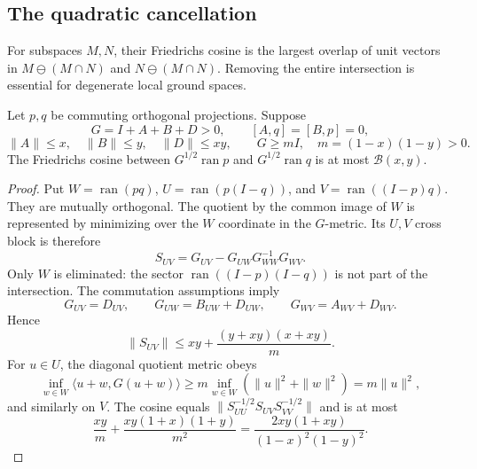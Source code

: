 \subsection{The quadratic cancellation}

For subspaces $M,N$, their Friedrichs cosine is the largest overlap of
unit vectors in $M\ominus(M\cap N)$ and $N\ominus(M\cap N)$.
Removing the entire intersection is essential for degenerate local
ground spaces.

\begin{lemma}
\label{q:lem-schur}
Let $p,q$ be commuting orthogonal projections.  Suppose
\[
 G=I+A+B+D>0,\qquad [A,q]=[B,p]=0,
\]
\[
 \|A\|\leq x,\quad \|B\|\leq y,\quad \|D\|\leq xy,
 \qquad G\geq mI,\quad m=(1-x)(1-y)>0.
\]
The Friedrichs cosine between $G^{1/2}\operatorname{ran}p$ and
$G^{1/2}\operatorname{ran}q$ is at most $\mathcal B(x,y)$.
\end{lemma}

\begin{proof}
Put $W=\operatorname{ran}(pq)$,
$U=\operatorname{ran}(p(I-q))$, and
$V=\operatorname{ran}((I-p)q)$.  They are mutually orthogonal.  The
quotient by the common image of $W$ is represented by minimizing over
the $W$ coordinate in the $G$-metric.  Its $U,V$ cross block is therefore
\[
 S_{UV}=G_{UV}-G_{UW}G_{WW}^{-1}G_{WV}.
\]
Only $W$ is eliminated: the sector
$\operatorname{ran}((I-p)(I-q))$ is not part of the intersection.
The commutation assumptions imply
\[
 G_{UV}=D_{UV},\qquad
 G_{UW}=B_{UW}+D_{UW},\qquad
 G_{WV}=A_{WV}+D_{WV}.
\]
Hence
\[
 \|S_{UV}\|\leq xy+\frac{(y+xy)(x+xy)}m.
\]
For $u\in U$, the diagonal quotient metric obeys
\[
 \inf_{w\in W}\langle u+w,G(u+w)\rangle
 \geq m\inf_{w\in W}(\|u\|^2+\|w\|^2)=m\|u\|^2,
\]
and similarly on $V$.  The cosine equals
$\|S_{UU}^{-1/2}S_{UV}S_{VV}^{-1/2}\|$ and is at most
\[
 \frac{xy}{m}+
 \frac{xy(1+x)(1+y)}{m^2}
 =\frac{2xy(1+xy)}{(1-x)^2(1-y)^2}.
\]
\end{proof}

